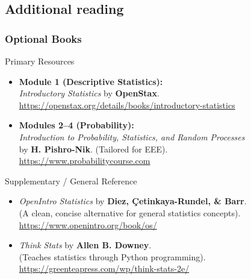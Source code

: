 \subsection{Additional reading}
\begin{frame}[allowframebreaks]
\frametitle{Optional Books}


\begin{block}{Primary Resources}
\begin{itemize}
    \item \textbf{Module 1 (Descriptive Statistics):} \\
    \emph{Introductory Statistics} by \textbf{OpenStax}. \\
    \url{https://openstax.org/details/books/introductory-statistics}

    \item \textbf{Modules 2--4 (Probability):} \\
    \emph{Introduction to Probability, Statistics, and Random Processes} \\
    by \textbf{H. Pishro-Nik}. (Tailored for EEE). \\
    \url{https://www.probabilitycourse.com}
\end{itemize}
\end{block}

\begin{block}{Supplementary / General Reference}
\begin{itemize}
    \item \emph{OpenIntro Statistics} by \textbf{Diez, Çetinkaya-Rundel, \& Barr}. \\
    (A clean, concise alternative for general statistics concepts). \\
    \url{https://www.openintro.org/book/os/}

    \item \emph{Think Stats} by \textbf{Allen B. Downey}. \\
    (Teaches statistics through Python programming). \\
    \url{https://greenteapress.com/wp/think-stats-2e/}


\end{itemize}
\end{block}
\end{frame}
